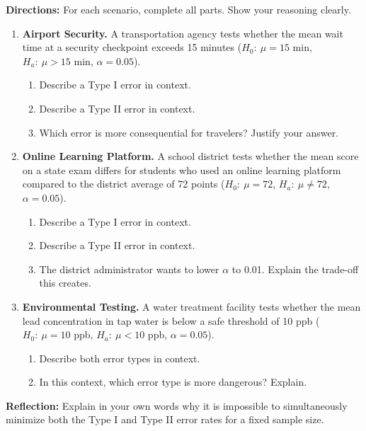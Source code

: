 \documentclass[10pt]{article}
\begin{document}
\namedateperiod

\vspace{0.1in}
\textbf{Directions:} For each scenario, complete all parts. Show your reasoning clearly.

\begin{enumerate}

  \item \textbf{Airport Security.} A transportation agency tests whether the mean wait
        time at a security checkpoint exceeds 15 minutes
        ($H_0{:}\ \mu = 15$ min, $H_a{:}\ \mu > 15$ min, $\alpha = 0.05$).

        \begin{enumerate}[label=\alph*.]
          \item Describe a Type I error in context.
          \item Describe a Type II error in context.
          \item Which error is more consequential for travelers? Justify your answer.
        \end{enumerate}

  \item \textbf{Online Learning Platform.} A school district tests whether the mean
        score on a state exam differs for students who used an online learning platform
        compared to the district average of 72 points
        ($H_0{:}\ \mu = 72$, $H_a{:}\ \mu \ne 72$, $\alpha = 0.05$).

        \begin{enumerate}[label=\alph*.]
          \item Describe a Type I error in context.
          \item Describe a Type II error in context.
          \item The district administrator wants to lower $\alpha$ to 0.01.
                Explain the trade-off this creates.
        \end{enumerate}

  \item \textbf{Environmental Testing.} A water treatment facility tests whether the
        mean lead concentration in tap water is below a safe threshold of 10 ppb
        ($H_0{:}\ \mu = 10$ ppb, $H_a{:}\ \mu < 10$ ppb, $\alpha = 0.05$).

        \begin{enumerate}[label=\alph*.]
          \item Describe both error types in context.
          \item In this context, which error type is more dangerous? Explain.
        \end{enumerate}

\end{enumerate}

\begin{reflectionbox}
\textbf{Reflection:} Explain in your own words why it is impossible to simultaneously
minimize both the Type I and Type II error rates for a fixed sample size.

\end{reflectionbox}
\end{document}
